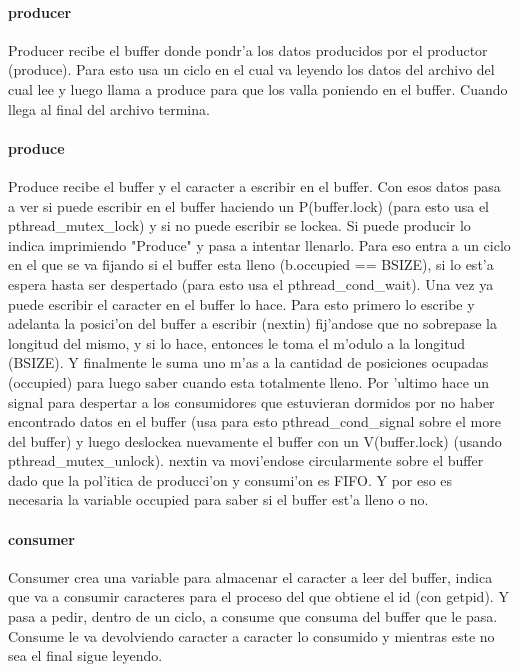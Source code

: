 \paragraph{producer}
Producer recibe el buffer donde pondr'a los datos producidos por el productor (produce). Para esto usa un ciclo en el cual va leyendo los datos del archivo del cual lee y luego llama a produce para que los valla poniendo en el buffer. Cuando llega al final del archivo termina.

\paragraph{produce}
Produce recibe el buffer y el caracter a escribir en el buffer. Con esos datos pasa a ver si puede escribir en el buffer haciendo un P(buffer.lock) (para esto usa el pthread\_mutex\_lock) y si no puede escribir se lockea.  Si puede producir lo indica imprimiendo "Produce" y pasa a intentar llenarlo. Para eso entra a un ciclo en el que se va fijando si el buffer esta lleno (b.occupied == BSIZE), si lo est'a espera hasta ser despertado (para esto usa el pthread\_cond\_wait). Una vez ya puede escribir el caracter en el buffer lo hace. Para esto primero lo escribe y adelanta la posici'on del buffer a escribir (nextin) fij'andose que no sobrepase la longitud del mismo, y si lo hace, entonces le toma el m'odulo a la longitud (BSIZE). Y finalmente le suma uno m'as a la cantidad de posiciones ocupadas (occupied) para luego saber cuando esta totalmente lleno. Por 'ultimo hace un signal para despertar a los consumidores que estuvieran dormidos por no haber encontrado datos en el buffer (usa para esto pthread\_cond\_signal sobre el more del buffer) y luego deslockea nuevamente el buffer con un V(buffer.lock) (usando pthread\_mutex\_unlock). nextin va movi'endose circularmente sobre el buffer dado que la pol'itica de producci'on y consumi'on es FIFO. Y por eso es necesaria la variable occupied para saber si el buffer est'a lleno o no.

\paragraph{consumer}
Consumer crea una variable para almacenar el caracter a leer del buffer, indica que va a consumir caracteres para el proceso del que obtiene el id (con getpid). Y pasa a pedir, dentro de un ciclo, a consume que consuma del buffer que le pasa. Consume le va devolviendo caracter a caracter lo consumido y mientras este no sea el final sigue leyendo.


